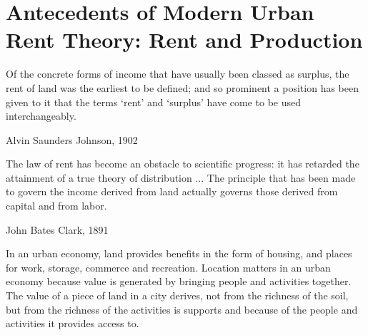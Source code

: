 \chapter{Antecedents of Modern Urban Rent Theory: Rent and Production} \label{chapter-rent}

\epigraph{Of the concrete forms of income that have usually been classed as surplus, the rent of land was the earliest to be defined; and so prominent a position has been given to it that the terms `rent' and `surplus' have come to be used interchangeably.}{Alvin Saunders Johnson, 1902 \cite{johnsonRentModernEconomic1902}}
\epigraph{The law of rent has become an obstacle to scientific progress: it has retarded the attainment of a true theory of distribution ... %
The principle that has been made to govern the income derived from land actually governs those derived from capital and from labor. 
}{John Bates Clark, 1891 \cite{clarkDistributionDeterminedLaw1891}}





In an urban economy, land provides benefits in the form of housing, and places for work, storage, commerce and recreation. Location matters in an urban economy because value is generated by bringing people and activities together. The value of a piece of land in a city derives, not from the richness of the soil, but from the richness of the activities is supports and because of the people and activities it provides access to.   

